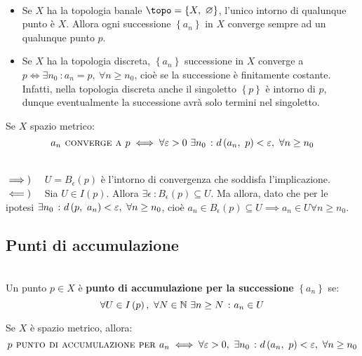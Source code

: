\begin{examples}~{}
	\begin{itemize}
		\item Se $X$ ha la topologia banale $\topo=\left\{X,\ \emptyset\right\}$, l'unico intorno di qualunque punto è $X$. Allora ogni successione $\left\{a_n\right\}$ in $X$ converge sempre ad un qualunque punto $p$.
		\item Se $X$ ha la topologia discreta, $\left\{a_n\right\}$ successione in $X$ converge a $p\iff \exists n_0\ \colon a_n=p,\ \forall n\geq n_0$, cioè se la successione è finitamente costante. Infatti, nella topologia discreta anche il singoletto $\left\{p\right\}$ è intorno di $p$, dunque eventualmente la successione avrà solo termini nel singoletto.
	\end{itemize}
\vspace{-3mm}
\end{examples}
\begin{observe}
Se $X$ spazio metrico:
\begin{equation}
	a_n\textsc{ converge a } p\iff \forall \varepsilon>0\ \exists n_0\ \colon d\left(a_n,\ p\right)<\varepsilon,\ \forall n\geq n_0
\end{equation}
\vspace{-6mm}
\end{observe}
\begin{demonstration}~{}\\
	$\implies)\quad$ $U=B_{\epsilon}\left(p\right)$ è l'intorno di convergenza che soddisfa l'implicazione.\\
	$\impliedby)\quad$ Sia $U\in I\left(p\right)$. Allora $\exists \epsilon\ \colon B_{\epsilon}\left(p\right)\subseteq U$. Ma allora, dato che per le ipotesi $\exists n_0\ \colon d\left(p,\ a_n\right)<\varepsilon,\ \forall n\geq n_0$, cioè $a_n\in B_{\epsilon}\left(p\right)\subseteq U\implies a_n\in U\forall n\geq n_0$.
\end{demonstration}
\subsection{Punti di accumulazione}
\begin{define}~{}\\
	Un punto $p\in X$ è \textbf{punto di accumulazione per la successione} $\left\{a_n\right\}$ se:
	\begin{equation}
		\forall U\in I\left(p\right),\ \forall N\in\mathbb{N}\ \exists n\geq N\ \colon a_n\in U
	\end{equation}
\vspace{-6mm}
\end{define}
\begin{exercise}
	Se $X$ è spazio metrico, allora:
	\begin{equation}
		p\textsc{ punto di accumulazione per } a_n\iff \forall \epsilon>0,\ \exists n_0\ \colon \mvf{d}{a_n}{p}<\epsilon,\ \forall n\geq n_0
	\end{equation}
\vspace{-6mm}
\end{exercise}

